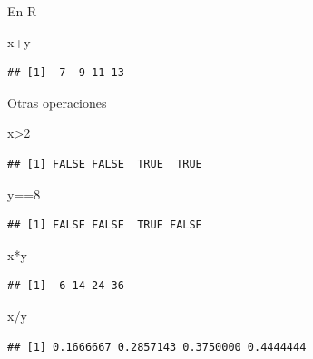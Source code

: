 \documentclass[
  12pt,
]{book}
\newenvironment{Shaded}{\begin{snugshade}}{\end{snugshade}}
\newcommand{\DecValTok}[1]{\textcolor[rgb]{0.00,0.00,0.81}{#1}}
\newcommand{\NormalTok}[1]{#1}
\newcommand{\SpecialCharTok}[1]{\textcolor[rgb]{0.00,0.00,0.00}{#1}}
\begin{document}
En R

\begin{Shaded}
\begin{Highlighting}[]
\NormalTok{x}\SpecialCharTok{+}\NormalTok{y}
\end{Highlighting}
\end{Shaded}

\begin{verbatim}
## [1]  7  9 11 13
\end{verbatim}

Otras operaciones

\begin{Shaded}
\begin{Highlighting}[]
\NormalTok{x}\SpecialCharTok{\textgreater{}}\DecValTok{2}
\end{Highlighting}
\end{Shaded}

\begin{verbatim}
## [1] FALSE FALSE  TRUE  TRUE
\end{verbatim}

\begin{Shaded}
\begin{Highlighting}[]
\NormalTok{y}\SpecialCharTok{==}\DecValTok{8}
\end{Highlighting}
\end{Shaded}

\begin{verbatim}
## [1] FALSE FALSE  TRUE FALSE
\end{verbatim}

\begin{Shaded}
\begin{Highlighting}[]
\NormalTok{x}\SpecialCharTok{*}\NormalTok{y}
\end{Highlighting}
\end{Shaded}

\begin{verbatim}
## [1]  6 14 24 36
\end{verbatim}

\begin{Shaded}
\begin{Highlighting}[]
\NormalTok{x}\SpecialCharTok{/}\NormalTok{y}
\end{Highlighting}
\end{Shaded}

\begin{verbatim}
## [1] 0.1666667 0.2857143 0.3750000 0.4444444
\end{verbatim}
\end{document}
